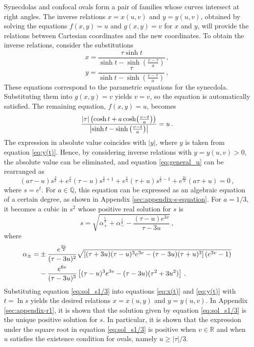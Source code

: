 \documentclass[12pt, ams, nofootinbib]{revtex4}
\def\be{\begin{equation}}
\def\ee{\end{equation}}
\def\e{e}
\def\Sinh{{\rm sinh}}  %
\def\Cosh{{\rm cosh}}
\newcommand{\rob}[1]{\left(#1\right)}    %
\newcommand{\sqb}[1]{\left[#1\right]}    %
\newcommand{\abb}[1]{\left|#1\right|}    %
\renewcommand{\Re}{\mathbb{R}}           %
\theoremstyle{definition}
\begin{document}
Synecdolas and confocal ovals form a pair of families whose curves intersect at right angles. The inverse relations $x=x(u,v)$ and $y=y(u,v)$, obtained by solving the equations $f(x,y)=u$ and $g(x,y)=v$ for $x$ and $y$, will provide the relations between Cartesian coordinates and the new coordinates. To obtain the inverse relations, consider the substitutions
\be
	x=\frac{\tau\sinh t}{\sinh t-\sinh{\rob{\frac{v-\tau}{a}}}}\,, \label{eq:x(t)}
\ee
\be
	y=\frac{\tau}{\sinh t-\sinh{\rob{\frac{v-\tau}{a}}}}\,, \label{eq:y(t)}
\ee
These equations correspond to the parametric equations for the synecdola. Substituting them into $g(x,y)=v$ yields $v=v$, so the equation is automatically satisfied. The remaining equation, $f(x,y)=u$, becomes
\be
	\frac{|\tau|\rob{\cosh{t}+a\,\Cosh{\rob{\frac{v-t}{a}}}}}{\abb{\sinh t-\Sinh\rob{\frac{v-t}{a}}}} = u\,. \label{eq:general_u}
\ee
The expression in absolute value coincides with $|y|$, where $y$ is taken from equation \ref{eq:y(t)}. Hence, by considering inverse relations with $y=y(u,v)>0$, the absolute value can be eliminated, and equation \ref{eq:general_u} can be rearranged as
\be 
	(a\tau-u)s^{\frac{2}{a}}+ \e^{\frac{v}{a}}(\tau-u)s^{\frac{1}{a}+1} + \e^{\frac{v}{a}}(\tau+u)s^{\frac{1}{a}-1}+\e^{\frac{2v}{a}}(a\tau+u) = 0\,,
\ee
where $s=\e^t$. For $a\in\mathbb{Q}$, this equation can be expressed as an algebraic equation of a certain degree, as shown in Appendix \ref{sec:appendix-s-equation}. For $a=1/3$, it becomes a cubic in $s^2$ whose positive real solution for $s$ is
\be
	s = \sqrt{\alpha_+^{\frac{1}{3}} + \alpha_{-}^{\frac{1}{3}}-\frac{(\tau-u)\e^{3v}}{\tau-3u}}\,, \label{eq:sol_s1/3}
\ee
where
\begin{align}
	\alpha_{\pm} =& \pm \frac{\e^{\frac{9v}{2}}}{(\tau-3u)^2}\sqrt{\sqb{(\tau+3u)(\tau-u)^3\e^{3v}-(\tau-3u)(\tau+u)^3}(\e^{3v}-1)} \notag \\  
				&-\frac{\e^{6v}}{(\tau-3u)^3} \sqb{(\tau-u)^3\e^{3v}-(\tau-3u)(\tau^2+3u^2)}\,. \label{eq:sol_s1/3_aux}
\end{align}
Substituting equation \ref{eq:sol_s1/3} into equations \ref{eq:x(t)} and \ref{eq:y(t)} with $t=\ln s$ yields the desired relations $x=x(u,y)$ and $y=y(u,v)$. In Appendix \ref{sec:appendix-r1}, it is shown that the solution given by equation \ref{eq:sol_s1/3} is the unique positive solution for $s$. In particular, it is shown that the expression under the square root in equation \ref{eq:sol_s1/3} is positive when $v\in\Re$ and when $u$ satisfies the existence condition for ovals, namely $u\geq|\tau|/3$.
\end{document}
